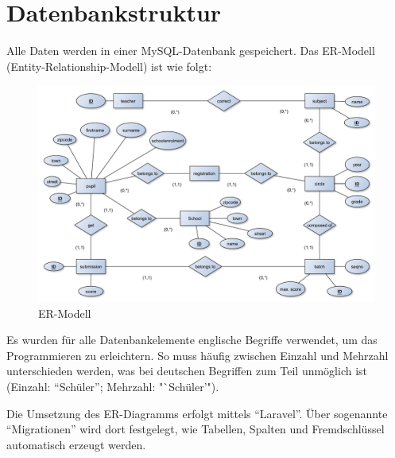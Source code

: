 \section{Datenbankstruktur}

Alle Daten werden in einer MySQL-Datenbank gespeichert. Das ER-Modell (Entity-Relationship-Modell) ist wie folgt: 

\begin{figure}[ht]
	\centering
	\includegraphics[scale=.48]{bilder/ER_Modell_englisch.pdf}
	\caption{ER-Modell}
	\label{abb:beispiel}
\end{figure}

Es wurden für alle Datenbankelemente englische Begriffe verwendet, um das Programmieren zu erleichtern. So muss häufig zwischen Einzahl und Mehrzahl unterschieden werden, was bei deutschen Begriffen zum Teil unmöglich ist (Einzahl: "`Schüler"'; Mehrzahl: "`Schüler'").

Die Umsetzung des ER-Diagramms erfolgt mittels "`Laravel"'. Über sogenannte "`Migrationen"' wird dort festgelegt, wie Tabellen, Spalten und Fremdschlüssel automatisch erzeugt werden.